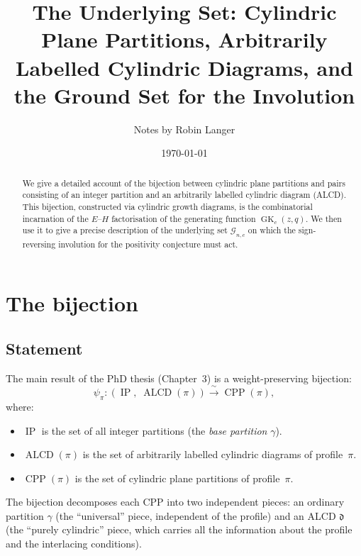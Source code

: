 \documentclass[11pt]{article}
\title{The Underlying Set: Cylindric Plane Partitions, Arbitrarily Labelled
Cylindric Diagrams, and the Ground Set for the Involution}
\author{Notes by Robin Langer}
\date{\today}
\newcommand{\GK}{\operatorname{GK}}
\newcommand{\CPP}{\operatorname{CPP}}
\newcommand{\IP}{\operatorname{IP}}
\newcommand{\ALCD}{\operatorname{ALCD}}
\theoremstyle{plain}
\theoremstyle{definition}
\begin{document}
\maketitle

\begin{abstract}
We give a detailed account of the bijection between cylindric plane
partitions and pairs consisting of an integer partition and an
arbitrarily labelled cylindric diagram (ALCD).  This bijection,
constructed via cylindric growth diagrams, is the combinatorial
incarnation of the $E$--$H$ factorisation of the generating function
$\GK_c(z,q)$.  We then use it to give a precise description of the
underlying set $\mathcal{G}_{n,c}$ on which the sign-reversing
involution for the positivity conjecture must act.
\end{abstract}

\tableofcontents

\section{The bijection}
\label{sec:bijection}

\subsection{Statement}

The main result of the PhD thesis (Chapter~3) is a weight-preserving
bijection:
\begin{equation}\label{eq:bijection}
  \psi_\pi \colon (\IP,\; \ALCD(\pi)) \xrightarrow{\;\sim\;} \CPP(\pi),
\end{equation}
where:
\begin{itemize}
  \item $\IP$ is the set of all integer partitions (the \emph{base
    partition} $\gamma$).
  \item $\ALCD(\pi)$ is the set of arbitrarily labelled cylindric
    diagrams of profile~$\pi$.
  \item $\CPP(\pi)$ is the set of cylindric plane partitions of
    profile~$\pi$.
\end{itemize}

The bijection decomposes each CPP into two independent pieces: an
ordinary partition $\gamma$ (the ``universal'' piece, independent of
the profile) and an ALCD $\mathfrak{d}$ (the ``purely cylindric'' piece,
which carries all the information about the profile and the interlacing
conditions).
\end{document}
